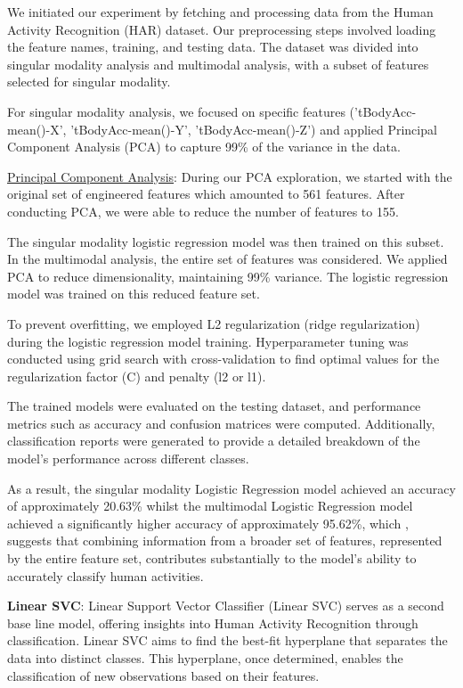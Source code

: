 \documentclass[11pt]{article}
\begin{document}
We initiated our experiment by fetching and processing data from the Human Activity Recognition (HAR) dataset. Our preprocessing steps involved loading the feature names, training, and testing data. The dataset was divided into singular modality analysis and multimodal analysis, with a subset of features selected for singular modality.

For singular modality analysis, we focused on specific features ('tBodyAcc-mean()-X', 'tBodyAcc-mean()-Y', 'tBodyAcc-mean()-Z') and applied Principal Component Analysis (PCA) to capture 99\% of the variance in the data. \newline 

\underline{Principal Component Analysis}: During our PCA exploration, we started with the original set of engineered features which amounted to 561 features. After conducting PCA, we were able to reduce the number of features to 155. 


The singular modality logistic regression model was then trained on this subset. In the multimodal analysis, the entire set of features was considered. We applied PCA to reduce dimensionality, maintaining 99\% variance. The logistic regression model was trained on this reduced feature set.

To prevent overfitting, we employed L2 regularization (ridge regularization) during the logistic regression model training. Hyperparameter tuning was conducted using grid search with cross-validation to find optimal values for the regularization factor (C) and penalty (l2 or l1).

The trained models were evaluated on the testing dataset, and performance metrics such as accuracy and confusion matrices were computed. Additionally, classification reports were generated to provide a detailed breakdown of the model's performance across different classes.

As a result, the singular modality Logistic Regression model achieved an accuracy of approximately 20.63\% whilst the multimodal Logistic Regression model achieved a significantly higher accuracy of approximately 95.62\%, which , suggests that combining information from a broader set of features, represented by the entire feature set, contributes substantially to the model's ability to accurately classify human activities.


\textbf{Linear SVC}: 
Linear Support Vector Classifier (Linear SVC) serves as a second base line model, offering insights into Human Activity Recognition through classification. Linear SVC aims to find the best-fit hyperplane that separates the data into distinct classes. This hyperplane, once determined, enables the classification of new observations based on their features.
\end{document}

